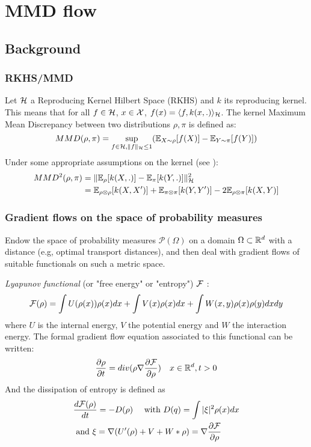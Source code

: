 \section{MMD flow}


\subsection{Background}

\subsubsection{RKHS/MMD}


Let ${{\mathcal H}}$ a Reproducing Kernel Hilbert Space (RKHS) and $k$ its reproducing kernel. This means that for all $f \in {{\mathcal H}}$, $x \in {{\mathcal X}}$, $f(x)=\langle f, k(x,.) \rangle_{{{\mathcal H}}}$. The kernel Maximum Mean Discrepancy between two distributions $\rho,\pi$ is defined as:
\begin{equation}
MMD(\rho,\pi)=\sup_{f \in {{\mathcal H}},  \|f\|_{{{\mathcal H}}}\le 1} ({{\mathbb E}}_{X \sim \rho}[f(X)]-{{\mathbb E}}_{Y \sim \pi}[f(Y)])
\end{equation}
Under some appropriate assumptions on the kernel (see \cite{gretton2012kernel}):
\begin{align}
MMD^2(\rho,\pi)&=\|{{\mathbb E}}_{\rho}[k(X,.)] - {{\mathbb E}}_{\pi}[k(Y,.)]\|^2_{{{\mathcal H}}}\\
&={{\mathbb E}}_{\rho \otimes \rho}[k(X,X')]+{{\mathbb E}}_{\pi \otimes \pi}[k(Y,Y')] - 2{{\mathbb E}}_{\rho \otimes \pi}[k(X,Y)]
\end{align}



\subsubsection{Gradient flows on the space of probability measures}
Endow the space of probability measures $\mathcal{P}(\Omega)$ on a domain $\Omega \subset {{\mathbb R}}^d$ with a distance (e.g, optimal transport distances), and then deal with gradient flows of suitable functionals on such a metric space.

\textit{Lyapunov functional} (or "free energy" or "entropy") ${{\mathcal F}}$  \citep{villani2004trend}:
\begin{equation}
{{\mathcal F}}(\rho)=\int U(\rho(x)) \rho(x)dx + \int V(x)\rho(x)dx + \int W(x,y)\rho(x)\rho(y)dxdy
\end{equation}
where  $U$ is the internal energy, $V$ the potential energy and $W$ the
interaction energy. The formal gradient flow equation associated to this functional can be written:
\begin{equation}
\frac{\partial \rho}{\partial t}= div( \rho \nabla \frac{\partial {{\mathcal F}}}{\partial \rho}) \quad x \in {{\mathbb R}}^d , t>0
\end{equation}
And the dissipation of entropy is defined as %
\begin{align}
&        \frac{d {{\mathcal F}}(\rho)}{dt} =-D(\rho) \quad \text{ with } D(q)= \int |\xi|^2 \rho(x)dx\\
&\text{ and } \xi= \nabla (U'(\rho) + V + W * \rho)= \nabla \frac{\partial {{\mathcal F}}}{\partial \rho}
\end{align}

